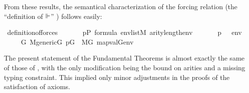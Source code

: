 %
From these results, the semantical characterization of the forcing
relation (the ``definition of $\Vdash$''
\cite[IV.2.22]{kunen2011set}) follows easily:
\begin{isabelle}
\isamarkupfalse%
\ definition{\isacharunderscore}of{\isacharunderscore}forces{\isacharcolon}\isanewline
\ \ \isanewline
\ \ \ \ {\isachardoublequoteopen}p{\isasymin}P{\isachardoublequoteclose}\ {\isachardoublequoteopen}{\isasymphi}{\isasymin}formula{\isachardoublequoteclose}\ {\isachardoublequoteopen}env{\isasymin}list{\isacharparenleft}M{\isacharparenright}{\isachardoublequoteclose}\ {\isachardoublequoteopen}arity{\isacharparenleft}{\isasymphi}{\isacharparenright}{\isasymle}length{\isacharparenleft}env{\isacharparenright}{\isachardoublequoteclose}\isanewline
\ \ \isanewline
\ \ \ \ {\isachardoublequoteopen}{\isacharparenleft}p\ {\isasymtturnstile}\ {\isasymphi}\ env{\isacharparenright}\ {\isasymlongleftrightarrow}\isanewline
\ \ \ \ \ {\isacharparenleft}{\isasymforall}G{\isachardot}\ M{\isacharunderscore}generic{\isacharparenleft}G{\isacharparenright}{\isasymand}\ p{\isasymin}G\ {\isasymlongrightarrow}\ M{\isacharbrackleft}G{\isacharbrackright}{\isacharcomma}\ map{\isacharparenleft}val{\isacharparenleft}G{\isacharparenright}{\isacharcomma}env{\isacharparenright}\ {\isasymTurnstile}\ {\isasymphi}{\isacharparenright}{\isachardoublequoteclose}
\end{isabelle}

The present statement of the Fundamental Theorems is almost exactly
the same of those of \cite{2019arXiv190103313G}, with the only
modification being the bound on arities and a missing typing
constraint. This implied only minor adjustments in the proofs of the
satisfaction of axioms.

